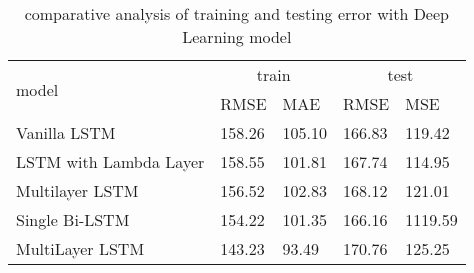 \begin{table}
\center
\caption{comparative analysis of training and testing error with Deep Learning model }
  \begin{tabular}{|l|l|l|l|l|}
    \hline
\hline
    \multirow{2}{*}{model} &
      \multicolumn{2}{c}{train} &
      \multicolumn{2}{c|}{test} \\ \cline{2-5}

    & RMSE& MAE & RMSE & MSE \\
    \hline
    Vanilla LSTM &158.26 & 105.10 & 166.83 & 119.42 \\
    \hline
    LSTM with Lambda Layer & 158.55 & 101.81& 167.74 & 114.95 \\
    \hline
    Multilayer LSTM & 156.52 & 102.83 & 168.12 & 121.01 \\
    \hline
Single Bi-LSTM &154.22&101.35&166.16&1119.59 \\
\hline
MultiLayer LSTM & 143.23&93.49 &170.76 & 125.25\\
\hline\hline
\end{tabular}
\label{tab:score}
\end{table}